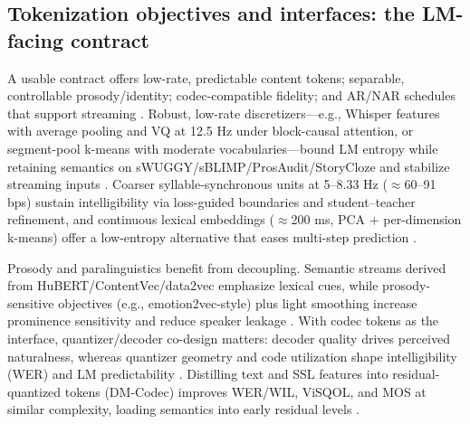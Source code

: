 \documentclass{article}
\begin{document}
\subsection{Tokenization objectives and interfaces: the LM-facing contract} \label{subsec:Tokenization objectives and interfaces: the LM-facing contract}
A usable contract offers low-rate, predictable content tokens; separable, controllable prosody/identity; codec-compatible fidelity; and AR/NAR schedules that support streaming \cite{guo2025recentadvancesdiscretespeechtokensreview}. Robust, low-rate discretizers---e.g., Whisper features with average pooling and VQ at 12.5 Hz under block-causal attention, or segment-pool k-means with moderate vocabularies---bound LM entropy while retaining semantics on sWUGGY/sBLIMP/ProsAudit/StoryCloze and stabilize streaming inputs \cite{zeng2024scalingspeechtextpretrainingsyntheticint,kando2025exploringeffectsegmentationvocabularysiz}. Coarser syllable-synchronous units at 5--8.33 Hz ($\approx$60--91 bps) sustain intelligibility via loss-guided boundaries and student--teacher refinement, and continuous lexical embeddings ($\approx$200 ms, PCA + per-dimension k-means) offer a low-entropy alternative that eases multi-step prediction \cite{baade2024syllablelmlearningcoarsesemanticunitsspe,algayres2023generativespokenlanguagemodelbasedcontin}.

Prosody and paralinguistics benefit from decoupling. Semantic streams derived from HuBERT/ContentVec/data2vec emphasize lexical cues, while prosody-sensitive objectives (e.g., emotion2vec-style) plus light smoothing increase prominence sensitivity and reduce speaker leakage \cite{onda2025benchmarkingprosodyencodingdiscretespeec}. With codec tokens as the interface, quantizer/decoder co-design matters: decoder quality drives perceived naturalness, whereas quantizer geometry and code utilization shape intelligibility (WER) and LM predictability \cite{li2024investigatingneuralaudiocodecsspeechlang}. Distilling text and SSL features into residual-quantized tokens (DM-Codec) improves WER/WIL, ViSQOL, and MOS at similar complexity, loading semantics into early residual levels \cite{ahasan2025dmcodecdistillingmultimodalrepresentatio}.
\end{document}
